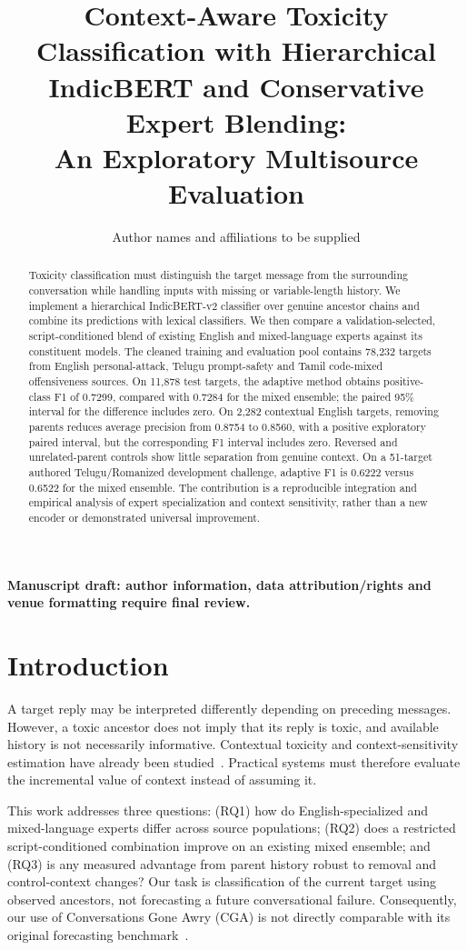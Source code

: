 \documentclass[11pt,a4paper]{article}
\title{Context-Aware Toxicity Classification with Hierarchical IndicBERT and Conservative Expert Blending:\\An Exploratory Multisource Evaluation}
\author{Author names and affiliations to be supplied}
\date{}
\begin{document}
\maketitle
\begin{center}\small\textbf{Manuscript draft: author information, data attribution/rights and venue formatting require final review.}\end{center}

\begin{abstract}
Toxicity classification must distinguish the target message from the surrounding conversation while handling inputs with missing or variable-length history. We implement a hierarchical IndicBERT-v2 classifier over genuine ancestor chains and combine its predictions with lexical classifiers. We then compare a validation-selected, script-conditioned blend of existing English and mixed-language experts against its constituent models. The cleaned training and evaluation pool contains 78,232 targets from English personal-attack, Telugu prompt-safety and Tamil code-mixed offensiveness sources. On 11,878 test targets, the adaptive method obtains positive-class F1 of 0.7299, compared with 0.7284 for the mixed ensemble; the paired 95\% interval for the difference includes zero. On 2,282 contextual English targets, removing parents reduces average precision from 0.8754 to 0.8560, with a positive exploratory paired interval, but the corresponding F1 interval includes zero. Reversed and unrelated-parent controls show little separation from genuine context. On a 51-target authored Telugu/Romanized development challenge, adaptive F1 is 0.6222 versus 0.6522 for the mixed ensemble. The contribution is a reproducible integration and empirical analysis of expert specialization and context sensitivity, rather than a new encoder or demonstrated universal improvement.
\end{abstract}

\section{Introduction}
A target reply may be interpreted differently depending on preceding messages. However, a toxic ancestor does not imply that its reply is toxic, and available history is not necessarily informative. Contextual toxicity and context-sensitivity estimation have already been studied~\citep{pavlopoulos2020,xenos2021}. Practical systems must therefore evaluate the incremental value of context instead of assuming it.

This work addresses three questions: (RQ1) how do English-specialized and mixed-language experts differ across source populations; (RQ2) does a restricted script-conditioned combination improve on an existing mixed ensemble; and (RQ3) is any measured advantage from parent history robust to removal and control-context changes? Our task is classification of the current target using observed ancestors, not forecasting a future conversational failure. Consequently, our use of Conversations Gone Awry (CGA) is not directly comparable with its original forecasting benchmark~\citep{zhang2018}.
\end{document}
